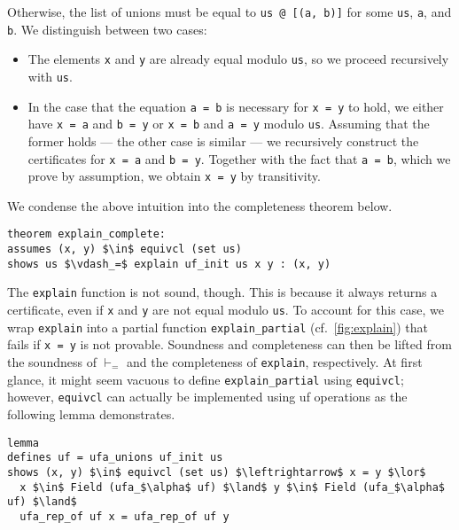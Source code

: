 \documentclass[
  sigplan,
  10pt,
  anonymous,
  review,
  ]{acmart}
\begin{document}
Otherwise, the list of unions must be equal to \lstinline|us @ [(a, b)]| for some \lstinline|us|, \lstinline|a|, and \lstinline|b|.
We distinguish between two cases:
\begin{itemize}
  \item The elements \lstinline|x| and \lstinline|y| are already equal modulo \lstinline|us|, so we proceed recursively with \lstinline|us|.
  \item In the case that the equation \lstinline|a = b| is necessary for \lstinline|x = y| to hold, we either have \lstinline|x = a| and \lstinline|b = y| or \lstinline|x = b| and \lstinline|a = y| modulo \lstinline|us|.
    Assuming that the former holds --- the other case is similar --- we recursively construct the certificates for \lstinline|x = a| and \lstinline|b = y|.
    Together with the fact that \lstinline|a = b|, which we prove by assumption, we obtain \lstinline|x = y| by transitivity.
\end{itemize}

We condense the above intuition into the completeness theorem below.
\begin{lstlisting}
theorem explain_complete:
assumes (x, y) $\in$ equivcl (set us)
shows us $\vdash_=$ explain uf_init us x y : (x, y)
\end{lstlisting}

The \lstinline|explain| function is not sound, though.
This is because it always returns a certificate, even if \lstinline|x| and \lstinline|y| are not equal modulo \lstinline|us|.
To account for this case, we wrap \lstinline|explain| into a partial function \lstinline|explain_partial| (cf.\ \autoref{fig:explain}) that fails if \lstinline|x = y| is not provable.
Soundness and completeness can then be lifted from the soundness of $\vdash_=$ and the completeness of \lstinline|explain|, respectively.
At first glance, it might seem vacuous to define \lstinline|explain_partial| using \lstinline|equivcl|;
however, \lstinline|equivcl| can actually be implemented using \acrshort{uf} operations as the following lemma demonstrates.
\begin{lstlisting}
lemma
defines uf = ufa_unions uf_init us
shows (x, y) $\in$ equivcl (set us) $\leftrightarrow$ x = y $\lor$
  x $\in$ Field (ufa_$\alpha$ uf) $\land$ y $\in$ Field (ufa_$\alpha$ uf) $\land$
  ufa_rep_of uf x = ufa_rep_of uf y
\end{lstlisting}
\end{document}

